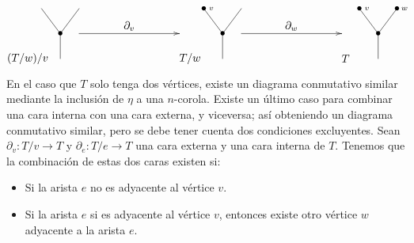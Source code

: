 \documentclass[../main.tex]{subfiles}
\begin{document}
\begin{equation}
    \xy
    <0.08cm, 0cm>:
    (0.0, 0.0)*{}="1"; %
    (0.0, 10.0)*=0{\bullet}="2"; %
    (-7.5, 20.0)*{}="3"; %
    (7.5, 20.0)*{}="4"; %
    "1";"2" **\dir{-};
    "2";"3" **\dir{-};
    "2";"4" **\dir{-};
    (-13,0)*{(T/w)/v};
    \endxy
    \xy
    <0.08cm, 0cm>:
    (-20, 0.0)*{}="1";
    (20, 0.0)*{}="2";
    (20, 10)*{}="3";
    (-20, 0)*{}="4";
    {\ar(-20, 10)*{};(20,10)*{}};
    (0,13)*{\partial_v};
    \endxy
    \xy
    <0.08cm, 0cm>:
    (0.0, 0.0)*{}="1"; %
    (0.0, 10.0)*=0{\bullet}="2"; %
    (-7.5, 20.0)*=0{\bullet}="3"; %
    (7.5, 20.0)*{}="4"; %
    "1";"2" **\dir{-};
    "2";"3" **\dir{-};
    "2";"4" **\dir{-};
    (-4.5, 20.0)*=0{\scriptstyle v};
    (-13,0)*{T/w};
    \endxy
    \xy
    <0.08cm, 0cm>:
    (-20, 0.0)*{}="1";
    (20, 0.0)*{}="2";
    (20, 10)*{}="3";
    (-20, 0)*{}="4";
    {\ar(-20, 10)*{};(20,10)*{}};
    (0,13)*{\partial_w};
    \endxy
    \xy
    <0.08cm, 0cm>:
    (0.0, 0.0)*{}="1"; %
    (0.0, 10.0)*=0{\bullet}="2"; %
    (-7.5, 20.0)*=0{\bullet}="3"; %
    (7.5, 20.0)*=0{\bullet}="4"; %
    "1";"2" **\dir{-};
    "2";"3" **\dir{-};
    "2";"4" **\dir{-};
    (-4.5, 20.0)*=0{\scriptstyle v};
    (10.5, 20.0)*=0{\scriptstyle w};
    (-13,0)*{T};
    \endxy
\end{equation}

En el caso que $T$ solo tenga dos v\'ertices, existe un diagrama conmutativo similar mediante la inclusi\'on de $\eta$ a una $n$-corola.
Existe un \'ultimo caso para combinar una cara interna con una cara externa, y viceversa; as\'i obteniendo un diagrama conmutativo similar, pero se debe tener cuenta dos condiciones excluyentes.
Sean $\partial_v \colon T/v\to T$ y $\partial_e \colon T/e\to T$ una cara externa y una cara interna de $T$. Tenemos que la combinaci\'on de estas dos caras existen si:
\begin{itemize}
    \item Si la arista $e$ no es adyacente al v\'ertice $v$.
    \item Si la arista $e$ si es adyacente al v\'ertice $v$, entonces existe otro v\'ertice $w$ adyacente a la arista $e$.
\end{itemize}
\end{document}
